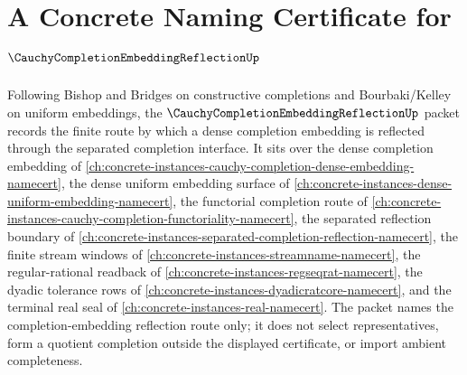 \chapter{A Concrete Naming Certificate for $\CauchyCompletionEmbeddingReflectionUp$}
\label{ch:concrete-instances-cauchy-completion-embedding-reflection-namecert}

Following Bishop and Bridges on constructive completions and Bourbaki/Kelley on uniform embeddings, the $\CauchyCompletionEmbeddingReflectionUp$ packet records the finite route by which a dense completion embedding is reflected through the separated completion interface. It sits over the dense completion embedding of \autoref{ch:concrete-instances-cauchy-completion-dense-embedding-namecert}, the dense uniform embedding surface of \autoref{ch:concrete-instances-dense-uniform-embedding-namecert}, the functorial completion route of \autoref{ch:concrete-instances-cauchy-completion-functoriality-namecert}, the separated reflection boundary of \autoref{ch:concrete-instances-separated-completion-reflection-namecert}, the finite stream windows of \autoref{ch:concrete-instances-streamname-namecert}, the regular-rational readback of \autoref{ch:concrete-instances-regseqrat-namecert}, the dyadic tolerance rows of \autoref{ch:concrete-instances-dyadicratcore-namecert}, and the terminal real seal of \autoref{ch:concrete-instances-real-namecert}. The packet names the completion-embedding reflection route only; it does not select representatives, form a quotient completion outside the displayed certificate, or import ambient completeness.

